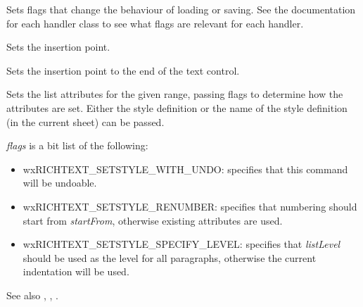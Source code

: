 Sets flags that change the behaviour of loading or saving. See the documentation for each
handler class to see what flags are relevant for each handler.

\label{wxrichtextctrlsetinsertionpoint}


Sets the insertion point.

\label{wxrichtextctrlsetinsertionpointend}


Sets the insertion point to the end of the text control.

\label{wxrichtextctrlsetliststyle}



Sets the list attributes for the given range, passing flags to determine how the attributes are set.
Either the style definition or the name of the style definition (in the current sheet) can be passed.

{\it flags} is a bit list of the following:

\begin{itemize}\itemsep=0pt
\item wxRICHTEXT\_SETSTYLE\_WITH\_UNDO: specifies that this command will be undoable.
\item wxRICHTEXT\_SETSTYLE\_RENUMBER: specifies that numbering should start from {\it startFrom}, otherwise existing attributes are used.
\item wxRICHTEXT\_SETSTYLE\_SPECIFY\_LEVEL: specifies that {\it listLevel} should be used as the level for all paragraphs, otherwise the current indentation will be used.
\end{itemize}

See also , , .

